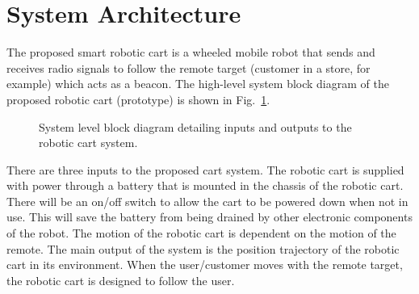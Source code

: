 \documentclass[conference]{IEEEtran}
\def\smgrid{0.5}
\begin{document}
\section{System Architecture}
\label{sec:systemArchitecture}
The proposed smart robotic cart is a wheeled mobile robot that sends and
receives radio signals to follow the remote target (customer in a store, for
example) which acts as a beacon. The high-level system block diagram of the
proposed robotic cart (prototype) is shown in Fig.~\ref{fig:sys_block_diag}. %
% 
\begin{figure}[htbp]
    \centering
  \caption{System level block diagram detailing inputs and outputs to the
    robotic cart system.}
	\label{fig:sys_block_diag}
\end{figure}
% 
There are three inputs to the proposed cart system. The robotic cart is supplied
with power through a battery that is mounted in the chassis of the robotic cart.
There will be an on/off switch to allow the cart to be powered down when not in
use. This will save the battery from being drained by other electronic
components of the robot. The motion of the robotic cart is dependent on the
motion of the remote. The main output of the system is the position trajectory
of the robotic cart in its environment. When the user/customer moves with the
remote target, the robotic cart is designed to follow the user.
\end{document}
